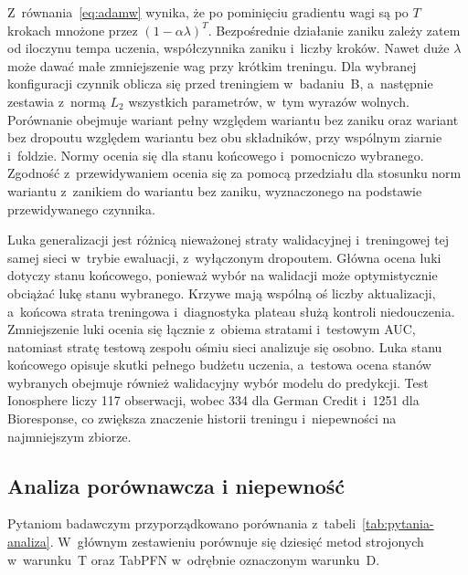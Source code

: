 Z~równania~\eqref{eq:adamw} wynika, że po pominięciu gradientu wagi są po $T$ krokach mnożone przez $(1-\alpha\lambda)^T$. Bezpośrednie działanie zaniku zależy zatem od iloczynu tempa uczenia, współczynnika zaniku i~liczby kroków. Nawet duże $\lambda$ może dawać małe zmniejszenie wag przy krótkim treningu. Dla wybranej konfiguracji czynnik oblicza się przed treningiem w~badaniu~B, a~następnie zestawia z~normą $L_2$ wszystkich parametrów, w~tym wyrazów wolnych. Porównanie obejmuje wariant pełny względem wariantu bez zaniku oraz wariant bez dropoutu względem wariantu bez obu składników, przy wspólnym ziarnie i~foldzie. Normy ocenia się dla stanu końcowego i~pomocniczo wybranego. Zgodność z~przewidywaniem ocenia się za pomocą przedziału dla stosunku norm wariantu z~zanikiem do wariantu bez zaniku, wyznaczonego na podstawie przewidywanego czynnika.

Luka generalizacji jest różnicą nieważonej straty walidacyjnej i~treningowej tej samej sieci w~trybie ewaluacji, z~wyłączonym dropoutem. Główna ocena luki dotyczy stanu końcowego, ponieważ wybór na walidacji może optymistycznie obciążać lukę stanu wybranego. Krzywe mają wspólną oś liczby aktualizacji, a~końcowa strata treningowa i~diagnostyka plateau służą kontroli niedouczenia. Zmniejszenie luki ocenia się łącznie z~obiema stratami i~testowym AUC, natomiast stratę testową zespołu ośmiu sieci analizuje się osobno. Luka stanu końcowego opisuje skutki pełnego budżetu uczenia, a~testowa ocena stanów wybranych obejmuje również walidacyjny wybór modelu do predykcji. Test Ionosphere liczy 117 obserwacji, wobec 334 dla German Credit i~1251 dla Bioresponse, co zwiększa znaczenie historii treningu i~niepewności na najmniejszym zbiorze.

\subsection{Analiza porównawcza i niepewność}
\label{sec:analiza-plan}

Pytaniom badawczym przyporządkowano porównania z~tabeli~\ref{tab:pytania-analiza}. W~głównym zestawieniu porównuje się dziesięć metod strojonych w~warunku~T oraz TabPFN w~odrębnie oznaczonym warunku~D.

